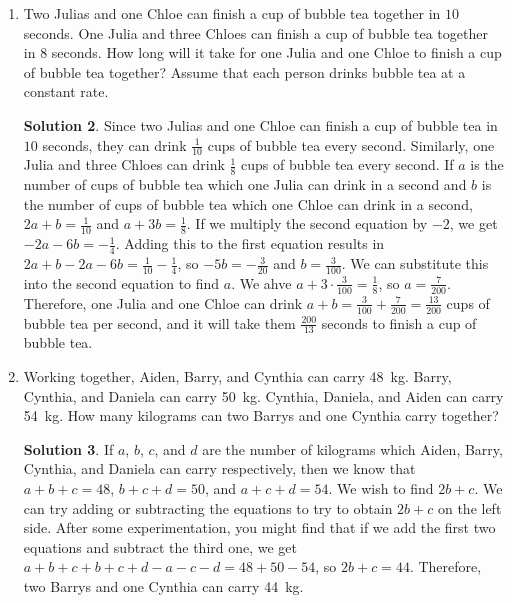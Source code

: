 \documentclass{article}
\theoremstyle{definition}
\newtheorem*{solution}{Solution}
\begin{document}
\begin{enumerate}
\begin{solution}
            To solve this using a system of equations, let $a$ be the number of
            correctly answered questions and let $b$ be the number of
            incorrectly answered questions. $a + b = 50$ and $5a - b = 184$. If
            we add the two equations, we get $a + b + 5a - b = 50 + 184$, so $6a
            = 234$ and $a = 39$.
        \end{solution}
        \item Two Julias and one Chloe can finish a cup of bubble tea together
        in $10$ seconds. One Julia and three Chloes can finish a cup of bubble
        tea together in $8$ seconds. How long will it take for one Julia and one
        Chloe to finish a cup of bubble tea together? Assume that each person
        drinks bubble tea at a constant rate.
        \begin{solution}
            Since two Julias and one Chloe can finish a cup of bubble tea in
            $10$ seconds, they can drink $\frac{1}{10}$ cups of bubble tea every
            second. Similarly, one Julia and three Chloes can drink
            $\frac{1}{8}$ cups of bubble tea every second. If $a$ is the number
            of cups of bubble tea which one Julia can drink in a second and $b$
            is the number of cups of bubble tea which one Chloe can drink in a
            second, $2a + b = \frac{1}{10}$ and $a + 3b = \frac{1}{8}$. If we
            multiply the second equation by $-2$, we get $-2a - 6b =
            -\frac{1}{4}$. Adding this to the first equation results in $2a + b
            - 2a - 6b = \frac{1}{10} - \frac{1}{4}$, so $-5b = -\frac{3}{20}$
            and $b = \frac{3}{100}$. We can substitute this into the second
            equation to find $a$. We ahve $a + 3 \cdot \frac{3}{100} =
            \frac{1}{8}$, so $a = \frac{7}{200}$. Therefore, one Julia and one
            Chloe can drink $a + b = \frac{3}{100} + \frac{7}{200} =
            \frac{13}{200}$ cups of bubble tea per second, and it will take them
            $\frac{200}{13}$ seconds to finish a cup of bubble tea.
        \end{solution}
        \item Working together, Aiden, Barry, and Cynthia can carry
        \SI{48}{\kilogram}. Barry, Cynthia, and Daniela can carry
        \SI{50}{\kilogram}. Cynthia, Daniela, and Aiden can carry
        \SI{54}{\kilogram}. How many kilograms can two Barrys and one Cynthia
        carry together?
        \begin{solution}
            If $a$, $b$, $c$, and $d$ are the number of kilograms which Aiden,
            Barry, Cynthia, and Daniela can carry respectively, then we know
            that $a + b + c = 48$, $b + c + d = 50$, and $a + c + d = 54$. We
            wish to find $2b + c$. We can try adding or subtracting the
            equations to try to obtain $2b + c$ on the left side. After some
            experimentation, you might find that if we add the first two
            equations and subtract the third one, we get $a + b + c + b + c + d
            - a - c - d = 48 + 50 - 54$, so $2b + c = 44$. Therefore, two Barrys
            and one Cynthia can carry \SI{44}{\kilogram}.


\end{solution}
\end{enumerate}
\end{document}
